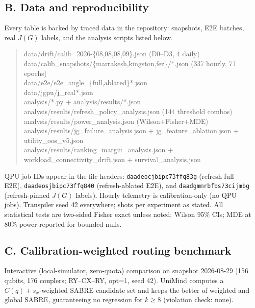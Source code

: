 \documentclass[journal,10pt,twocolumn]{IEEEtran}
\begin{document}
\subsection*{B. Data and reproducibility}
\label{sec:data}
Every table is backed by traced data in the repository: snapshots, E2E batches, real $J(G)$ labels, and the
analysis scripts listed below.
\begin{quote}\small\raggedright\ttfamily
data/drift/calib\_2026-\{08,08,08,09\}.json (D0--D3, 4 daily)\\
data/calib\_snapshots/\{marrakesh,kingston,fez\}/*.json (337 hourly, 71 epochs)\\
data/e2e/e2e\_angle\_\{full,ab\-lated\}*.json\\
data/jgpu/j\_real*.json\\
analysis/*.py + analysis/results/*.json\\[2pt]
analysis/results/refresh\_policy\_an\-a\-lysis.json (144 threshold combos)\\
analysis/results/power\_an\-a\-lysis.json (Wilson+Fisher+MDE)\\
analysis/results/jg\_fail\-ure\_an\-a\-lysis.json +
jg\_feature\_ablation.json + utility\_oos\_v5.json\\
analysis/results/ranking\_margin\_analysis.json +
workload\_connectivity\_drift.json + survival\_analysis.json\\
\end{quote}
QPU job IDs appear in the file headers:
\texttt{daadeocjbipc73ffq83g} (refresh-full E2E), \texttt{daadeosjbipc73ffq840} (refresh-ablated E2E), and
\texttt{daadgmmrbfbs73cijmbg} (refresh-pinned $J(G)$ labels). Hourly telemetry is calibration-only (no QPU jobs).
Transpiler seed 42 everywhere; shots per experiment as stated. All statistical tests are two-sided Fisher exact
unless noted; Wilson 95\% CIs; MDE at $80\%$ power reported for bounded nulls.

\subsection*{C. Calibration-weighted routing benchmark}
\label{app:routing}
Interactive (local-simulator, zero-quota) comparison on snapshot 2026-08-29 (156 qubits, 176 couplers; RY--CX--RY,
opt=1, seed 42). UniMind computes a $C(q)+s_x$-weighted SABRE candidate set and keeps the better of weighted and
global SABRE, guaranteeing no regression for $k\ge8$ (violation check: none).
\end{document}

